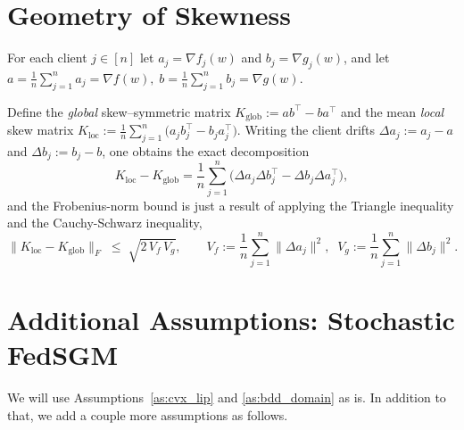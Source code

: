 \documentclass{article} %
\begin{document}
\section{Geometry of Skewness}
\label{sec:skewness}
For each client $j\in[n]$ let $a_j=\nabla f_j(w)$ and $b_j=\nabla g_j(w)$, and let
$
a=\frac1n\sum_{j=1}^n a_j=\nabla f(w),\;
b=\frac1n\sum_{j=1}^n b_j=\nabla g(w).
$


Define the {\em global} skew–symmetric matrix
$
K_{\mathrm{glob}}:=ab^\top-ba^\top
$
and the mean {\em local} skew matrix
$
K_{\mathrm{loc}}:=\frac1n\sum_{j=1}^n
\bigl(a_j b_j^\top-b_j a_j^\top\bigr).
$
Writing the client drifts $\Delta a_j:=a_j-a$ and $\Delta b_j:=b_j-b$, one obtains the exact decomposition
\[
K_{\mathrm{loc}}-K_{\mathrm{glob}}
=\frac1n\sum_{j=1}^n\!\bigl(\Delta a_j\Delta b_j^\top-
\Delta b_j\Delta a_j^\top\bigr),
\]
and the Frobenius-norm bound is just a result of applying the Triangle inequality and the Cauchy-Schwarz inequality, 
\[
\|K_{\mathrm{loc}}-K_{\mathrm{glob}}\|_F
\;\le\;
\sqrt{2\,V_f\,V_g},
\qquad
V_f:=\frac1n\sum_{j=1}^n\|\Delta a_j\|^2,\;\;
V_g:=\frac1n\sum_{j=1}^n\|\Delta b_j\|^2.
\]
\section{Additional Assumptions: Stochastic FedSGM}
We will use Assumptions~\ref{as:cvx_lip} and \ref{as:bdd_domain} as is. In addition to that, we add a couple more assumptions as follows.
\end{document}
